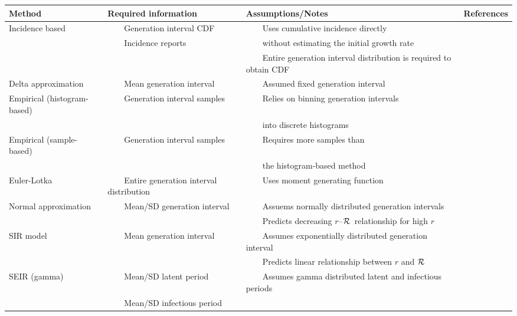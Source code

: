 \documentclass[12pt, landscape]{article}
\newcommand{\rR}{\mbox{$r$--$\cal R$}}
\newcommand{\RR}{\ensuremath{{\cal R}}}
\newcommand{\tabitem}{~~\llap{\textbullet}~~}
\newcommand{\tabphant}{\hphantom\tabitem}
\begin{document}
\begin{table}
\centering
\footnotesize
\begin{tabular}{l|l|l|c}
\hline
\bf Method & \bf Required information & \bf Assumptions/Notes & \bf References \\
\hline
Incidence based & \tabitem Generation interval CDF & \tabitem Uses cumulative incidence directly & \cite{nishiura2010correcting} \\
 & \tabitem Incidence reports & \tabphant without estimating the initial growth rate  & \\
 & & \tabitem Entire generation interval distribution is required to obtain CDF & \\
\hline
Delta approximation & \tabitem Mean generation interval & \tabitem Assumed fixed generation interval & \cite{wallinga2007generation, roberts2007model} \\
\hline
Empirical (histogram-based) & \tabitem Generation interval samples & \tabitem Relies on binning generation intervals & \cite{wallinga2007generation} \\
& & \tabphant into discrete histograms &\\
\hline
Empirical (sample-based) & \tabitem Generation interval samples & \tabitem Requires more samples than & \cite{hampson2009transmission}\\
& & \tabphant the histogram-based method & \\
\hline
Euler-Lotka & \tabitem Entire generation interval distribution & \tabitem Uses moment generating function & \cite{Lotka} \\
\hline
Normal approximation & \tabitem Mean/SD generation interval & \tabitem Assuems normally distributed generation intervals & \cite{wallinga2007generation}\\
& & \tabitem Predicts decreasing \rR\ relationship for high $r$ & \\
\hline
SIR model & \tabitem Mean generation interval & \tabitem Assumes exponentially distributed generation interval & \cite{anderson1992infectious, pybus2001epidemic, ferguson2005strategies, wallinga2007generation} \\
& & \tabitem Predicts linear relationship between $r$ and \RR\ & \\
\hline
SEIR (gamma) & \tabitem Mean/SD latent period & \tabitem Assumes gamma distributed latent and infectious periods & \cite{anderson1980spread, wearing2005appropriate, wallinga2007generation, roberts2007model} \\
& \tabitem Mean/SD infectious period & & \\

\end{tabular}
\end{table}
\end{document}
